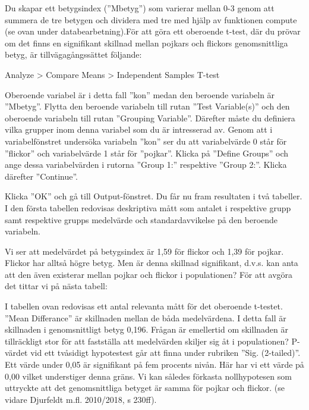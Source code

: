 \documentclass[
]{book}
\begin{document}
Du skapar ett betygsindex (''Mbetyg'') som varierar mellan 0-3 genom att summera de tre betygen
och dividera med tre med hjälp av funktionen compute (se ovan under databearbetning).För att göra ett oberoende t-test, där du prövar om det finns en signifikant skillnad mellan pojkars och
flickors genomsnittliga betyg, är tillvägagångssättet följande:

Analyze \textgreater{} Compare Means \textgreater{} Independent Samples T-test

Oberoende variabel är i detta fall ''kon'' medan den beroende variabeln är ''Mbetyg''. Flytta den
beroende variabeln till rutan ''Test Variable(s)'' och den oberoende variabeln till rutan ''Grouping
Variable''. Därefter måste du definiera vilka grupper inom denna variabel som du är intresserad av.
Genom att i variabelfönstret undersöka variabeln ''kon'' ser du att variabelvärde 0 står för ''flickor''
och variabelvärde 1 står för ''pojkar''. Klicka på ''Define Groups'' och ange dessa variabelvärden i
rutorna ''Group 1:'' respektive ''Group 2:''. Klicka därefter ''Continue''.

Klicka ''OK'' och gå till Output-fönstret. Du får nu fram resultaten i två tabeller. I den första tabellen
redovisas deskriptiva mått som antalet i respektive grupp samt respektive grupps medelvärde och
standardavvikelse på den beroende variabeln.

Vi ser att medelvärdet på betygsindex är 1,59 för flickor och 1,39 för pojkar. Flickor har alltså högre
betyg. Men är denna skillnad signifikant, d.v.s. kan anta att den även existerar mellan pojkar och
flickor i populationen? För att avgöra det tittar vi på nästa tabell:

I tabellen ovan redovisas ett antal relevanta mått för det oberoende t-testet. ''Mean Differance'' är
skillnaden mellan de båda medelvärdena. I detta fall är skillnaden i genomsnittligt betyg 0,196.
Frågan är emellertid om skillnaden är tillräckligt stor för att fastställa att medelvärden skiljer sig åt i
populationen? P-värdet vid ett tvåsidigt hypotestest går att finna under rubriken ''Sig. (2-tailed)''. Ett
värde under 0,05 är signifikant på fem procents nivån. Här har vi ett värde på 0,00 vilket understiger
denna gräns. Vi kan således förkasta nollhypotesen som uttryckte att det genomsnittliga betyget är
samma för pojkar och flickor. (se vidare Djurfeldt m.fl. 2010/2018, s 230ff).
\end{document}

